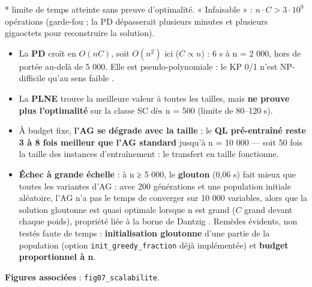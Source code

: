 \documentclass[
  french,
  11pt,
  a4paper,
]{article}
\providecommand{\tightlist}{%
  \setlength{\itemsep}{0pt}\setlength{\parskip}{0pt}}
\begin{document}
* limite de temps atteinte sans preuve d'optimalité. « Infaisable » :
\(n \cdot C > 3 \cdot 10^9\) opérations (garde-fou ; la PD dépasserait
plusieurs minutes et plusieurs gigaoctets pour reconstruire la
solution).

\begin{itemize}
\tightlist
\item
  La \textbf{PD} croît en \(O(nC)\), soit \(O(n^2)\) ici
  (\(C \propto n\)) : 6 s à n = 2 000, hors de portée au-delà de 5 000.
  Elle est pseudo-polynomiale : le KP 0/1 n'est NP-difficile qu'au sens
  faible \autocite{garey_johnson_1979,kellerer_improved_2004}.
\item
  La \textbf{PLNE} trouve la meilleure valeur à toutes les tailles, mais
  \textbf{ne prouve plus l'optimalité} sur la classe SC dès n = 500
  (limite de 80--120 s).
\item
  À budget fixe, \textbf{l'AG se dégrade avec la taille} ; le \textbf{QL
  pré-entraîné reste 3 à 8 fois meilleur que l'AG standard} jusqu'à n =
  10 000 --- soit 50 fois la taille des instances d'entraînement : le
  transfert en taille fonctionne.
\item
  \textbf{Échec à grande échelle} : à n ≥ 5 000, le \textbf{glouton}
  (0,06 s) fait mieux que toutes les variantes d'AG : avec 200
  générations et une population initiale aléatoire, l'AG n'a pas le
  temps de converger sur 10 000 variables, alors que la solution
  gloutonne est quasi optimale lorsque n est grand (\(C\) grand devant
  chaque poids), propriété liée à la borne de Dantzig
  \autocite{dantzig_1957,martello_toth_1990}. Remèdes évidents, non
  testés faute de temps : \textbf{initialisation gloutonne} d'une partie
  de la population (option \texttt{init\_greedy\_fraction} déjà
  implémentée) et \textbf{budget proportionnel à n}.
\end{itemize}

\textbf{Figures associées} : \texttt{fig07\_scalabilite}.

\printbibliography[title=Bibliographie]
\end{document}

